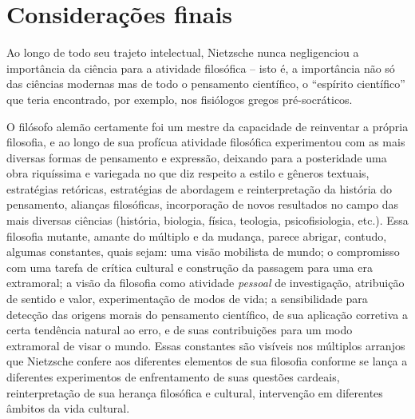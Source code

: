 \documentclass[
	12pt,				%
	openright,			%
	oneside,			%
	a4paper,			%
	english,			%
	french,				%
	spanish,			%
	brazil				%
	]{abntex2}
\begin{document}
\chapter*{Considerações finais}

Ao longo de todo seu trajeto intelectual, Nietzsche nunca negligenciou a importância da ciência para a atividade filosófica – isto é, a importância não só das ciências modernas mas de todo o pensamento científico, o “espírito científico” que teria encontrado, por exemplo, nos fisiólogos gregos pré-socráticos.

	O filósofo alemão certamente foi um mestre da capacidade de reinventar a própria filosofia, e ao longo de sua profícua atividade filosófica experimentou com as mais diversas formas de pensamento e expressão, deixando para a posteridade uma obra riquíssima e variegada no que diz respeito a estilo e gêneros textuais, estratégias retóricas, estratégias de abordagem e reinterpretação da história do pensamento, alianças filosóficas, incorporação de novos resultados no campo das mais diversas ciências (história, biologia, física, teologia, psicofisiologia, etc.). Essa filosofia mutante, amante do múltiplo e da mudança, parece abrigar, contudo, algumas constantes, quais sejam: uma visão mobilista de mundo; o compromisso com uma tarefa de crítica cultural e construção da passagem para uma era extramoral; a visão da filosofia como atividade \textit{pessoal} de investigação, atribuição de sentido e valor, experimentação de modos de vida; a sensibilidade para detecção das origens morais do pensamento científico, de sua aplicação corretiva a certa tendência natural ao erro, e de suas contribuições para um modo extramoral de visar o mundo. Essas constantes são visíveis nos múltiplos arranjos que Nietzsche confere aos diferentes elementos de sua filosofia conforme se lança a diferentes experimentos de enfrentamento de suas questões cardeais, reinterpretação de sua herança filosófica e cultural, intervenção em diferentes âmbitos da vida cultural.
	
\end{document}
